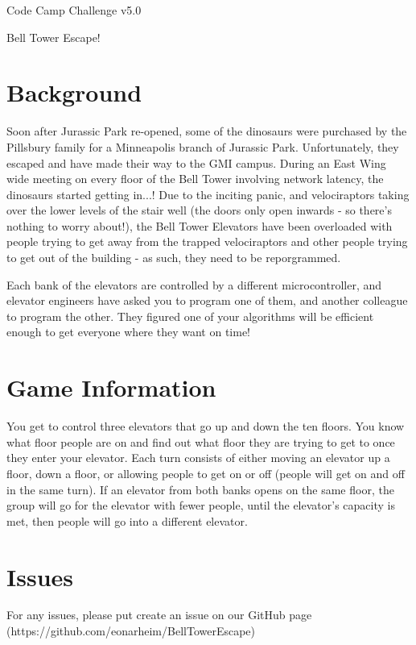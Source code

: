 \documentclass{article}
\begin{document}
\centerline{\sc \large Code Camp Challenge v5.0}
\vspace{.5pc}
\centerline{\sc Bell Tower Escape!}
\vspace{2pc}

\section*{Background}
Soon after Jurassic Park re-opened, some of the dinosaurs were purchased by the Pillsbury family for a Minneapolis branch of Jurassic Park. Unfortunately, they escaped and have made their way to the GMI campus. During an East Wing wide meeting on every floor of the Bell Tower involving network latency, the dinosaurs started getting in...! Due to the inciting panic, and velociraptors taking over the lower levels of the stair well (the doors only open inwards - so there's nothing to worry about!), the Bell Tower Elevators have been overloaded with people trying to get away from the trapped velociraptors and other people trying to get out of the building - as such, they need to be reporgrammed.

Each bank of the elevators are controlled by a different microcontroller, and elevator engineers have asked you to program one of them, and another colleague to program the other. They figured one of your algorithms will be efficient enough to get everyone where they want on time!

\section*{Game Information}
You get to control three elevators that go up and down the ten floors. You know what floor people are on and find out what floor they are trying to get to once they enter your elevator. Each turn consists of either moving an elevator up a floor, down a floor, or allowing people to get on or off (people will get on and off in the same turn). If an elevator from both banks opens on the same floor, the group will go for the elevator with fewer people, until the elevator's capacity is met, then people will go into a different elevator.

\section*{Issues}
For any issues, please put create an issue on our GitHub page (https://github.com/eonarheim/BellTowerEscape)
\end{document}
